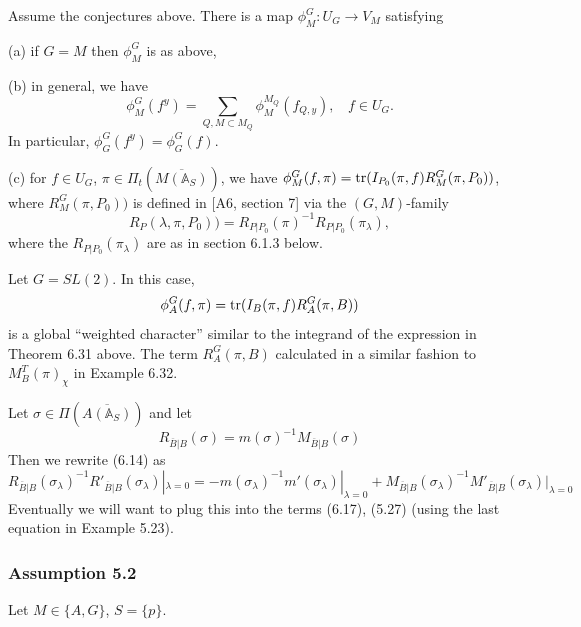\begin{theorem} Assume the conjectures above.
There is a map $\phi^G_M :U_G\rightarrow V_M$ satisfying

(a) if $G=M$ then $\phi^G_M$ is as above,

(b) in general, we have
\[
\phi_M^G(f^y)=
\sum_{Q ,M\subset M_Q}
\phi_M^{M_Q}(f_{Q,y}),\ \ \ \ f\in U_G.
\]
In particular, $\phi_G^G(f^y)=\phi_G^G(f)$.

(c) for $f\in U_G$, $\pi\in \Pi_t(\overline{M({\mathbb{A}}_S)})$,
we have $\phi^G_M(f,\pi)={\rm tr}(I_{P_0}(\pi,f)R_M^G(\pi,P_0))$,
where $R_M^G(\pi,P_0))$ is defined in [A6, section 7]
via the $(G,M)$-family
\[
R_P(\lambda, \pi,P_0))=
R_{P|P_0}(\pi)^{-1}R_{P|P_0}(\pi_\lambda),
\]
where the $R_{P|P_0}(\pi_\lambda)$ are as in section 6.1.3 below.
\end{theorem}

\begin{example} Let $G=SL(2)$. In this case,
\[
\phi^G_A(f,\pi)={\rm tr}(I_{B}(\pi,f)R_A^G(\pi,B))
\]
is a global ``weighted character'' similar to the integrand of
the expression in Theorem 6.31 above. The term $R_A^G(\pi,B)$
calculated in a similar fashion to $M_B^T(\pi)_\chi$
in Example 6.32.
\end{example}

Let $\sigma\in \Pi(\overline{A({\mathbb{A}}_S)})$ and let
\[
R_{\overline{B}|B}(\sigma)
=m(\sigma)^{-1}M_{\overline{B}|B}(\sigma)
\]
Then we rewrite (6.14) as 
\[
R_{\overline{B}|B}(\sigma_\lambda)^{-1}
R'_{\overline{B}|B}(\sigma_\lambda)|_{\lambda =0}
=-m(\sigma_\lambda)^{-1}m'(\sigma_\lambda)|_{\lambda =0}
+M_{\overline{B}|B}(\sigma_\lambda)^{-1}
M'_{\overline{B}|B}(\sigma_\lambda)|_{\lambda =0}
\]
Eventually we will want to plug this into the terms (6.17),
(5.27) (using the last equation in Example 5.23). 

\subsubsection{Assumption 5.2}

Let $M\in \{A,G\}$, $S=\{p\}$.

